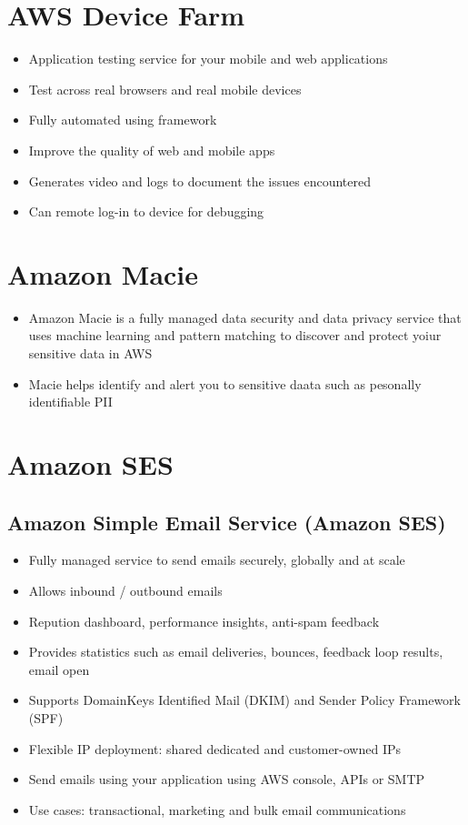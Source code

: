 \section{AWS Device Farm}
\begin{itemize}
    \item Application testing service for your mobile and web applications
    \item Test across real browsers and real mobile devices
    \item Fully automated using framework
    \item Improve the quality of web and mobile apps
    \item Generates video and logs to document the issues encountered
    \item Can remote log-in to device for debugging
\end{itemize}


\section{Amazon Macie}
\begin{itemize}
    \item Amazon Macie is a fully managed data security and data privacy service that uses machine learning and pattern matching to discover and protect yoiur sensitive data in AWS
    \item Macie helps identify and alert you to sensitive daata such as pesonally identifiable PII
\end{itemize}


\section{Amazon SES}

\subsection{Amazon Simple Email Service (Amazon SES)}
\begin{itemize}
    \item Fully managed service to send emails securely, globally and at scale
    \item Allows inbound / outbound emails
    \item Repution dashboard, performance insights, anti-spam feedback
    \item Provides statistics such as email deliveries, bounces, feedback loop results, email open
    \item Supports DomainKeys Identified Mail (DKIM) and Sender Policy Framework (SPF)
    \item Flexible IP deployment: shared dedicated and customer-owned IPs
    \item Send emails using your application using AWS console, APIs or SMTP
    \item Use cases: transactional, marketing and bulk email communications
\end{itemize}

